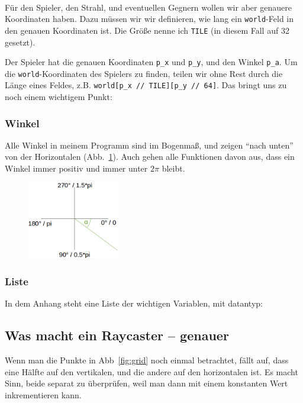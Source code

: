 \documentclass[a4paper,12pt]{report}
\begin{document}
\paragraph*{}
F\"ur den Spieler, den Strahl, und eventuellen Gegnern wollen wir aber genauere Koordinaten haben. Dazu m\"ussen wir wir definieren, wie lang ein \texttt{world}-Feld in den genauen Koordinaten ist. Die Gr\"o\ss e nenne ich \texttt{TILE} (in diesem Fall auf 32 gesetzt).

Der Spieler hat die genauen Koordinaten \texttt{p\_x} und \texttt{p\_y}, und den Winkel \texttt{p\_a}. Um die \texttt{world}-Koordinaten des Spielers zu finden, teilen wir ohne Rest durch die L\"ange eines Feldes, z.B. \texttt{world[p\_x // TILE][p\_y // 64]}. Das bringt uns zu noch einem wichtigem Punkt:

\subsubsection{Winkel}
Alle Winkel in meinem Programm sind im Bogenma\ss , und zeigen ``nach unten'' von der Horizontalen (Abb.~\ref{fig:angles}). Auch gehen alle Funktionen davon aus, dass ein Winkel immer positiv und immer unter $2\pi$ bleibt.
\begin{figure}[htbp] 
        \centering
        \includegraphics[width=4cm]{angles.png} 
        \label{fig:angles}
\end{figure}

\subsubsection{Liste}
In dem Anhang steht eine Liste der wichtigen Variablen, mit datantyp:


\subsection{Was macht ein Raycaster -- genauer}
Wenn man die Punkte in Abb~\ref{fig:grid} noch einmal betrachtet, f\"allt auf, dass eine H\"alfte auf den vertikalen, und die andere auf den horizontalen ist. Es macht Sinn, beide separat zu \"uberpr\"ufen, weil man dann mit einem konstanten Wert inkrementieren kann.
\end{document}
